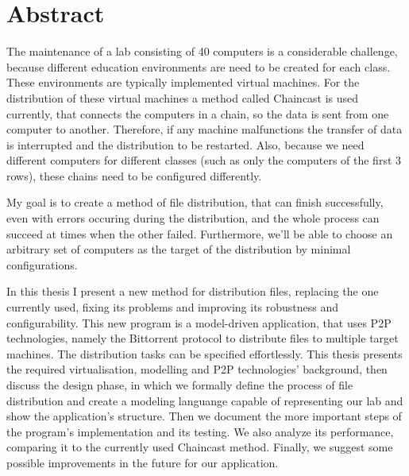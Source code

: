 \chapter*{Abstract}

The maintenance of a lab consisting of 40 computers is a considerable challenge, because different education environments are need to be created for each class. These environments are typically implemented virtual machines. For the distribution of these virtual machines a method called Chaincast is used currently, that connects the computers in a chain, so the data is sent from one computer to another. Therefore, if any machine malfunctions the transfer of data is interrupted and the distribution to be restarted. Also, because we need different computers for different classes (such as only the computers of the first 3 rows), these chains need to be configured differently.

My goal is to create a method of file distribution, that can finish successfully, even with errors occuring during the distribution, and the whole process can succeed at times when the other failed. Furthermore, we'll be able to choose an arbitrary set of computers as the target of the distribution by minimal configurations.

In this thesis I present a new method for distribution files, replacing the one currently used, fixing its problems and improving its robustness and configurability. 
This new program is a model-driven application, that uses P2P technologies, namely the Bittorrent protocol to distribute files to multiple target machines. The distribution tasks can be specified effortlessly. This thesis presents the required virtualisation, modelling and P2P technologies' background, then discuss the design phase, in which we formally define the process of file distribution and create a modeling languange capable of representing our lab and show the application's structure. Then we document the more important steps of the program's implementation and its testing. We also analyze its performance, comparing it to the currently used Chaincast method. Finally, we suggest some possible improvements in the future for our application.
\vfill

\selectthesislanguage
{}
\setcounter{romanPage}{\value{page}}

